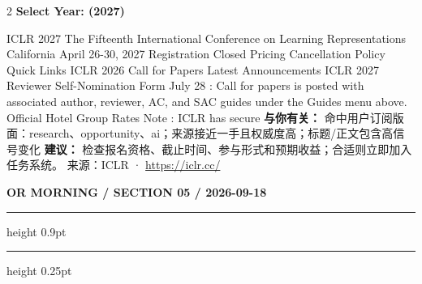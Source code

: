 \documentclass[10.5pt]{ctexart}
\begin{document}
\begin{multicols}{2}
{\large\bfseries Select Year: (2027)}\par
ICLR 2027 The Fifteenth International Conference on Learning Representations California April 26-30, 2027 Registration Closed Pricing Cancellation Policy Quick Links ICLR 2026 Call for Papers Latest Announcements ICLR 2027 Reviewer Self-Nomination Form July 28 : Call for papers is posted with associated author, reviewer, AC, and SAC guides under the Guides menu above. Official Hotel Group Rates Note : ICLR has secure
\textbf{与你有关：} 命中用户订阅版面：research、opportunity、ai；来源接近一手且权威度高；标题/正文包含高信号变化
\textbf{建议：} 检查报名资格、截止时间、参与形式和预期收益；合适则立即加入任务系统。
{\footnotesize\color{ormuted} 来源：ICLR · \url{https://iclr.cc/}}
\end{multicols}
\newpage
{\small\bfseries OR MORNING / SECTION 05 / 2026-09-18}
\vspace{2mm}
\hrule height 0.9pt
\vspace{1.5mm}
\hrule height 0.25pt
\vspace{4mm}
\end{document}
